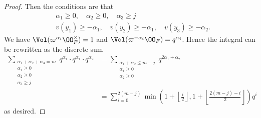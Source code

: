 \begin{proof}
  Then the conditions are that
  \begin{align*}
    &\alpha_1 \ge 0, \quad \alpha_2 \ge 0, \quad \alpha_3 \ge j \\
    &v(y_1) \ge - \alpha_1, \quad v(y_2) \ge - \alpha_1, \quad v(y_3) \ge -\alpha_2.
  \end{align*}
  We have $\Vol(\varpi^{\alpha_i} \OO_F^\times) = 1$
  and $\Vol(\varpi^{-\alpha_i} \OO_F) = q^{\alpha_i}$.
  Hence the integral can be rewritten as the discrete sum
  \begin{align*}
    \sum_{\substack{\alpha_1 + \alpha_2 + \alpha_3 = m \\ \alpha_1 \ge 0 \\ \alpha_2 \ge 0 \\ \alpha_3 \ge j}}
    q^{\alpha_1} \cdot q^{\alpha_1} \cdot q^{\alpha_2}
    &= \sum_{\substack{\alpha_1 + \alpha_2 \le m-j \\ \alpha_1 \ge 0 \\ \alpha_2 \ge 0}}
    q^{2\alpha_1+\alpha_2} \\
    &= \sum_{i=0}^{2(m-j)}
    \min \left( 1 + \left\lfloor \frac i2 \right\rfloor,
      1 + \left\lfloor \frac{2(m-j)-i}{2} \right\rfloor
    \right) q^i
  \end{align*}
  as desired.
\end{proof}

